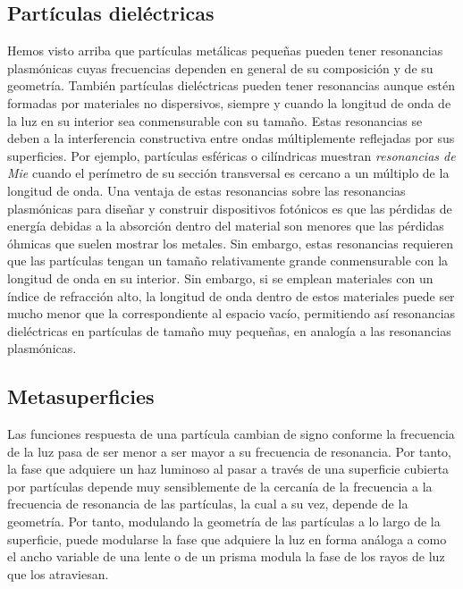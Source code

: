 \documentclass[12pt]{article}
\begin{document}
\subsection{Partículas dieléctricas}
Hemos visto arriba que partículas metálicas pequeñas pueden tener
resonancias plasmónicas cuyas frecuencias dependen en general de su
composición y de su geometría. También partículas dieléctricas pueden
tener resonancias aunque estén formadas por materiales no dispersivos,
siempre y cuando la longitud de onda de la luz en su interior sea
conmensurable con su tamaño. Estas resonancias se deben a la
interferencia constructiva entre ondas múltiplemente reflejadas por
sus superficies. Por ejemplo, partículas esféricas o cilíndricas
muestran {\em resonancias de Mie} cuando el perímetro de su sección
transversal es cercano a un múltiplo de la longitud de onda.  Una
ventaja de estas resonancias sobre las resonancias plasmónicas para
diseñar y construir dispositivos fotónicos es que las pérdidas de
energía debidas a la absorción dentro del material son menores que las
pérdidas óhmicas que suelen mostrar los metales. Sin embargo, estas
resonancias requieren que las partículas tengan un tamaño
relativamente grande conmensurable con la longitud de onda en su
interior. Sin embargo, si se emplean materiales con un índice de
refracción alto, la longitud de onda dentro de estos materiales puede
ser mucho menor que la correspondiente al espacio vacío, permitiendo
así resonancias dieléctricas en partículas de tamaño muy pequeñas, en
analogía a las resonancias plasmónicas.
\subsection{Metasuperficies}
Las funciones respuesta de una partícula cambian de signo conforme la
frecuencia de la luz pasa de ser menor a ser mayor a su frecuencia de
resonancia. Por tanto, la fase que adquiere un haz luminoso al pasar a
través de una superficie cubierta por partículas depende muy
sensiblemente de la cercanía de la frecuencia a la frecuencia de
resonancia de las partículas, la cual a su vez, depende de la
geometría. Por tanto, modulando la geometría de las partículas a lo
largo de la superficie, puede modularse la fase que adquiere la luz en
forma análoga a como el ancho variable de una lente o de un prisma
modula la fase de los rayos de luz que los atraviesan.
\end{document}
